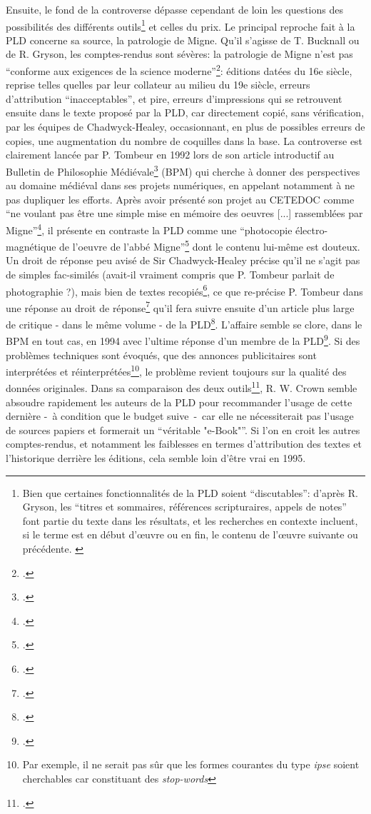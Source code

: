 Ensuite, le fond de la controverse dépasse cependant de loin les questions des possibilités des différents outils\footnote{Bien que certaines fonctionnalités de la PLD soient \enquote{discutables}: d'après R. Gryson, les \enquote{titres et sommaires, références scripturaires, appels de notes} font partie du texte dans les résultats, et les recherches en contexte incluent, si le terme est en début d'œuvre ou en fin, le contenu de l'œuvre suivante ou précédente. \cite[p. 148]{gryson_patrologia_1997}} et celles du prix. Le principal reproche fait à la PLD concerne sa source, la patrologie de Migne. Qu'il s'agisse de T. Bucknall ou de R. Gryson, les comptes-rendus sont sévères: la patrologie de Migne n'est pas \enquote{conforme aux exigences de la science moderne}\footcite[p. 147]{gryson_patrologia_1997}: éditions datées du 16e siècle, reprise telles quelles par leur collateur au milieu du 19e siècle, erreurs d'attribution \enquote{inacceptables}, et pire, erreurs d'impressions qui se retrouvent ensuite dans le texte proposé par la PLD, car directement copié, sans vérification, par les équipes de Chadwyck-Healey, occasionnant, en plus de possibles erreurs de copies, une augmentation du nombre de coquilles dans la base. La controverse est clairement lancée par P. Tombeur en 1992 lors de son article introductif au Bulletin de Philosophie Médiévale\footcite{tombeur_informatique_1992} (BPM) qui cherche à donner des perspectives au domaine médiéval dans ses projets numériques, en appelant notamment à ne pas dupliquer les efforts. Après avoir présenté son projet au CETEDOC comme \enquote{ne voulant pas être une simple mise en mémoire des oeuvres {[...]} rassemblées par Migne}\footcite[p. 44]{tombeur_informatique_1992}, il présente en contraste la PLD comme une \enquote{photocopie électro-magnétique de l'oeuvre de l'abbé Migne}\footcite[p. 45]{tombeur_informatique_1992} dont le contenu lui-même est douteux. Un droit de réponse peu avisé de Sir Chadwyck-Healey précise qu'il ne s'agit pas de simples fac-similés (avait-il vraiment compris que P. Tombeur parlait de photographie ?), mais bien de textes recopiés\footcite{chadwick-healey_droit_1993}, ce que re-précise P. Tombeur dans une réponse au droit de réponse\footcite{tombeur_reponse_1993} qu'il fera suivre ensuite d'un article plus large de critique - dans le même volume - de la PLD\footcite{tombeur_pld_1993}. L'affaire semble se clore, dans le BPM en tout cas, en 1994 avec l'ultime réponse d'un membre de la PLD\footcite{jordan_facts_1994}. Si des problèmes techniques sont évoqués, que des annonces publicitaires sont interprétées et réinterprétées\footnote{Par exemple, il ne serait pas sûr que les formes courantes du type \textit{ipse} soient cherchables car constituant des \textit{stop-words}}, le problème revient toujours sur la qualité des données originales. Dans sa comparaison des deux outils\footcite{crown_comparing_2000}, R. W. Crown semble absoudre rapidement les auteurs de la PLD pour recommander l'usage de cette dernière -~à condition que le budget suive~-~car elle ne nécessiterait pas l'usage de sources papiers et formerait un \enquote{véritable "e-Book"}. Si l'on en croit les autres comptes-rendus, et notamment les faiblesses en termes d'attribution des textes et l'historique derrière les éditions, cela semble loin d'être vrai en 1995.

